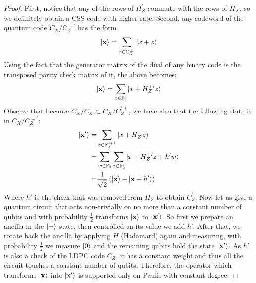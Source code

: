 \documentclass[manuscript,screen,review]{acmart}
\begin{document}
\begin{proof}
First, notice that any of the rows of $H_Z^{\prime}$ commute with the rows of $H_X$, so we definitely obtain a CSS code with higher rate. Second, any codeword of the quantum code $C_X/C_Z^{\perp \prime}$ has the form  
\begin{equation*}
  \begin{split}
    \ket{\mathbf{x}} = \sum_{z \in C_Z^{\perp \prime}}{\ket{x + z}}
  \end{split}
\end{equation*}
Using the fact that the generator matrix of the dual of any binary code is the transposed parity check matrix of it, the above becomes:
\begin{equation*}
  \begin{split}
    \ket{\mathbf{x}} = \sum_{z \in \mathbb{F}_2^s}{\ket{x + H_Z^{\perp \prime}z}}
  \end{split}
\end{equation*}
Observe that because $C_X/C_Z^{\perp} \subset C_X/C_Z^{\prime \perp}$, we have also that the following state is in $C_X/C_Z^{\perp \prime}$:
\begin{equation*}
  \begin{split} 
    \ket{\mathbf{x'}} = & \sum_{z \in \mathbb{F}_2^{s+1}}{\ket{x + H_Z^{\perp}z}} \\
    =& \sum_{w \in \mathbb{F}_2}\sum_{z \in \mathbb{F}_2^s}{\ket{x + H_Z^{\perp \prime}z + h'w  }} \\ 
    =& \frac{1}{\sqrt{2}}\left( \ket{\mathbf{x}} + \ket{\mathbf{x} + h^{\prime}} \right)
  \end{split}
\end{equation*}
Where $h'$ is the check that was removed from $H_Z$ to obtain $C_Z^{\prime}$. Now let us give a quantum circuit that acts non-trivially on no more than a constant number of qubits and with probability $\frac{1}{2}$ transforms $\ket{\mathbf{x}}$ to $\ket{\mathbf{x'}}$. So first we prepare an ancilla in the $\ket{+}$ state, then controlled on its value we add $h'$. After that, we rotate back the ancilla by applying $H$ (Hadamard) again and measuring, with probability $\frac{1}{2}$ we measure $\ket{0}$ and the remaining qubits hold the state $\ket{\mathbf{x'}}$. As $h'$ is also a check of the LDPC code $C_Z$, it has a constant weight and thus all the circuit touches a constant number of qubits. Therefore, the operator which transforms $\ket{\mathbf{x}}$ into $\ket{\mathbf{x'}}$ is supported only on Paulis with constant degree.     
\end{proof}

% 

\printbibliography
\end{document}
